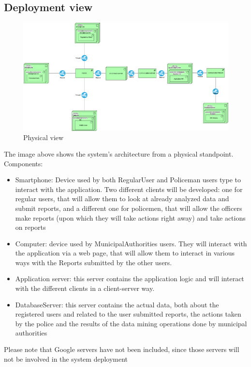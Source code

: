 \newpage
\subsection{Deployment view}

\begin{figure}[h!]
	\centering
	\includegraphics[width=\textwidth]{Images/physical_view}
	\caption{Physical view}
\end{figure}

The image above shows the system's architecture from a physical standpoint.
Components:
\begin{itemize}
\item Smartphone: Device used by both RegularUser and Policeman users type to interact with the application. Two different clients will be developed: one for regular users, that will allow them to look at already analyzed data and submit reports, and a different one for policemen, that will allow the officers make reports (upon which they will take actions right away) and take actions on reports
\item Computer: device used by MunicipalAuthorities users. They will interact with the application via a web page, that will allow them to interact in various ways with the Reports submitted by the other users.
\item Application server: this server contains the application logic and will interact with the different clients in a client-server way.
\item DatabaseServer: this server contains the actual data, both about the registered users and related to the user submitted reports, the actions taken by the police and the results of the data mining operations done by municipal authorities
\end{itemize}
Please note that Google servers have not been included, since those servers will not be involved in the system deployment
\newpage
